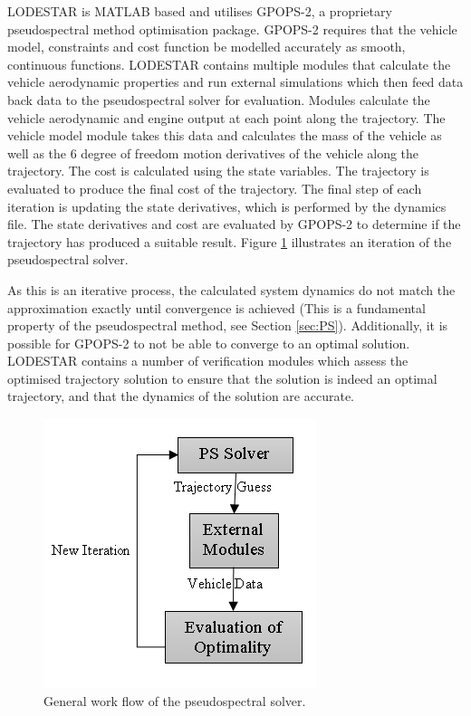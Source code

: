 LODESTAR is MATLAB based and utilises GPOPS-2, a proprietary pseudospectral method optimisation package.
GPOPS-2 requires that the vehicle model, constraints and cost function be modelled accurately as smooth, continuous functions. LODESTAR contains multiple modules that calculate the vehicle aerodynamic properties and run external simulations which then feed data back data to the pseudospectral solver for evaluation. Modules calculate the vehicle aerodynamic and engine output at each point along the trajectory. The vehicle model module takes this data and calculates the mass of the vehicle as well as the 6 degree of freedom motion derivatives of the vehicle along the trajectory. The cost is calculated using the state variables. The trajectory is evaluated to produce the final cost of the trajectory. The final step of each iteration is updating the state derivatives, which is performed by the dynamics file. The state derivatives and cost are evaluated by GPOPS-2 to determine if the trajectory has produced a suitable result. Figure \ref{fig:FlowChartSmall} illustrates an iteration of the pseudospectral solver.

 As this is an iterative process, the calculated system dynamics do not match the approximation exactly until convergence is achieved (This is a fundamental property of the pseudospectral method, see Section \ref{sec:PS}). Additionally, it is possible for GPOPS-2 to not be able to converge to an optimal solution. LODESTAR contains a number of verification modules which assess the optimised trajectory solution to ensure that the solution is indeed an optimal trajectory, and that the dynamics of the solution are accurate. 



\begin{figure}
	\centering
	\includegraphics[width=0.5\linewidth]{figures/4_LODESTAR/FlowChartSmall}
	\caption{General work flow of the pseudospectral solver.}
	\label{fig:FlowChartSmall}
\end{figure}


